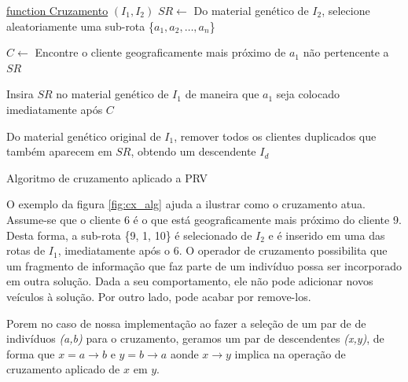 \begin{algorithm}
	   
	\underline{function Cruzamento} $(I_1,I_2)$\;
	\BlankLine
	$SR \leftarrow $ Do material genético de $I_2$, selecione  aleatoriamente uma sub-rota \{$a_1, a_2,…, a_n$\}
	
	$C \leftarrow $ Encontre o cliente geograficamente mais próximo de $a_1$ não pertencente a $SR$
		
	Insira $SR$ no material genético de $I_1$ de maneira que $a_1$ seja
	colocado imediatamente após $C$

	
	Do material genético original de $I_1$, remover todos os 
	clientes duplicados que também aparecem em $SR$, obtendo um descendente $I_d$ 
	
	\nl{}

	\caption{Algoritmo de cruzamento aplicado a PRV}\label{algcx_alg}
\end{algorithm}

O exemplo da figura \ref{fig:cx_alg} ajuda a ilustrar como o cruzamento atua. Assume-se que o cliente 6 é o que está geograficamente mais próximo do cliente 9. Desta forma, a sub-rota
\{9, 1, 10\} é selecionado de $I_2$ e é inserido em uma das rotas de $I_1$, imediatamente após o 6. O operador de cruzamento possibilita que um fragmento de informação que faz parte de um indivíduo possa ser incorporado em outra solução. Dada a seu comportamento, ele não pode adicionar novos veículos à solução. Por outro lado, pode acabar por remove-los.

\begin{center}
	\label{fig:cx_alg}
\end{center}


Porem no caso de nossa implementação ao fazer a seleção de um par de de indivíduos \textit{(a,b)} para o cruzamento, geramos um par de descendentes \textit{({x,y})}, de forma que \(x = a \rightarrow b\) e \(y = b \rightarrow a\) aonde $x \rightarrow y$ implica na operação de cruzamento aplicado de $x$ em $y$.


